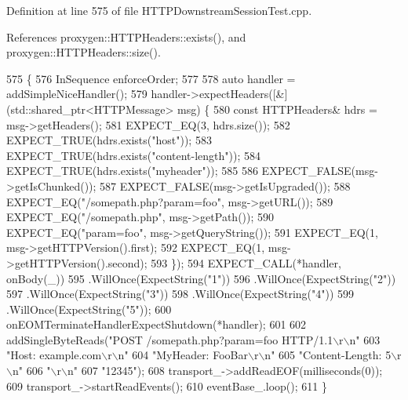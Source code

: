 Definition at line 575 of file H\+T\+T\+P\+Downstream\+Session\+Test.\+cpp.



References proxygen\+::\+H\+T\+T\+P\+Headers\+::exists(), and proxygen\+::\+H\+T\+T\+P\+Headers\+::size().


\begin{DoxyCode}
575                                                        \{
576   InSequence enforceOrder;
577 
578   \textcolor{keyword}{auto} handler = addSimpleNiceHandler();
579   handler->expectHeaders([&] (std::shared\_ptr<HTTPMessage> msg) \{
580       \textcolor{keyword}{const} HTTPHeaders& hdrs = msg->getHeaders();
581       EXPECT\_EQ(3, hdrs.size());
582       EXPECT\_TRUE(hdrs.exists(\textcolor{stringliteral}{"host"}));
583       EXPECT\_TRUE(hdrs.exists(\textcolor{stringliteral}{"content-length"}));
584       EXPECT\_TRUE(hdrs.exists(\textcolor{stringliteral}{"myheader"}));
585 
586       EXPECT\_FALSE(msg->getIsChunked());
587       EXPECT\_FALSE(msg->getIsUpgraded());
588       EXPECT\_EQ(\textcolor{stringliteral}{"/somepath.php?param=foo"}, msg->getURL());
589       EXPECT\_EQ(\textcolor{stringliteral}{"/somepath.php"}, msg->getPath());
590       EXPECT\_EQ(\textcolor{stringliteral}{"param=foo"}, msg->getQueryString());
591       EXPECT\_EQ(1, msg->getHTTPVersion().first);
592       EXPECT\_EQ(1, msg->getHTTPVersion().second);
593     \});
594   EXPECT\_CALL(*handler, onBody(\_))
595     .WillOnce(ExpectString(\textcolor{stringliteral}{"1"}))
596     .WillOnce(ExpectString(\textcolor{stringliteral}{"2"}))
597     .WillOnce(ExpectString(\textcolor{stringliteral}{"3"}))
598     .WillOnce(ExpectString(\textcolor{stringliteral}{"4"}))
599     .WillOnce(ExpectString(\textcolor{stringliteral}{"5"}));
600   onEOMTerminateHandlerExpectShutdown(*handler);
601 
602   addSingleByteReads(\textcolor{stringliteral}{"POST /somepath.php?param=foo HTTP/1.1\(\backslash\)r\(\backslash\)n"}
603                      \textcolor{stringliteral}{"Host: example.com\(\backslash\)r\(\backslash\)n"}
604                      \textcolor{stringliteral}{"MyHeader: FooBar\(\backslash\)r\(\backslash\)n"}
605                      \textcolor{stringliteral}{"Content-Length: 5\(\backslash\)r\(\backslash\)n"}
606                      \textcolor{stringliteral}{"\(\backslash\)r\(\backslash\)n"}
607                      \textcolor{stringliteral}{"12345"});
608   transport\_->addReadEOF(milliseconds(0));
609   transport\_->startReadEvents();
610   eventBase\_.loop();
611 \}
\end{DoxyCode}
